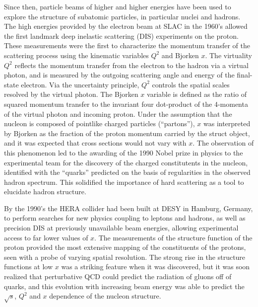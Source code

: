 Since then, particle beams of higher and higher energies have been used
to explore the structure of subatomic particles, in particular nuclei and hadrons.
The high energies provided by the electron beam at SLAC in the 1960's allowed the first
landmark deep inelastic scattering (DIS) experiments on the proton.
These measurements were the first to characterize the momentum transfer of the scattering
process using the kinematic variables $Q^2$ and Bjorken $x$.  The virtuality $Q^2$ reflects
the momentum transfer from the electron to the hadron via a virtual photon, and is measured
by the outgoing scattering angle and energy of the final-state electron.
Via the uncertainty principle, $Q^2$ controls the spatial scales resolved by the virtual photon.
The Bjorken $x$ variable is defined as the ratio of squared momentum transfer to the 
invariant four dot-product of the 4-momenta of the virtual photon and incoming proton.
Under the assumption that the nucleon is composed of pointlike charged particles (``partons''),
$x$ was interpreted by Bjorken as the fraction of the proton momentum carried by the 
struct object, and it was expected that cross sections would not vary with $x$.
The observation of this phenomenon led to the awarding of the 1990 Nobel prize in physics 
to the experimental team for the discovery of the charged constitutents in the nucleon,
identified with the ``quarks'' predicted on the basis of regularities in the observed hadron spectrum.
This solidified the importance of hard scattering as a tool to elucidate hadron structure.

By the 1990's the HERA collider had been built at DESY in Hamburg, Germany, to perform 
searches for new physics coupling to leptons and hadrons, as well as precision DIS 
at previously unavailable beam energies, allowing experimental access to far lower
values of $x$.  
The measurements of the structure function of the proton provided
the most extensive mapping of the constituents of the protons, seen with a probe 
of varying spatial resolution.  The strong rise in the structure functions at low $x$
was a striking feature when it was discovered, but it was soon realized that perturbative
QCD could predict the radiation of gluons off of quarks, and this evolution with
increasing beam energy was able to predict the $\sqrt{s}$, $Q^2$ and $x$ dependence
of the nucleon structure.


